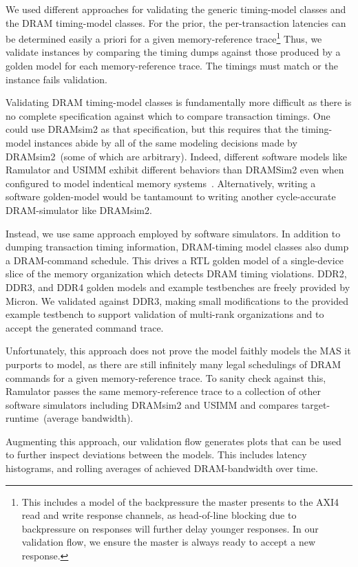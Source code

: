 We used different approaches for validating the generic timing-model classes
and the DRAM timing-model classes. For the prior, the per-transaction latencies
can be determined easily a priori for a given memory-reference trace\footnote{This
includes a model of the backpressure the master presents to the AXI4 read and
write response channels, as head-of-line blocking due to backpressure on
responses will further delay younger responses.  In our validation flow, we
ensure the master is always ready to accept a new response.} Thus, we validate
instances by comparing the timing dumps against those produced by a golden model
for each memory-reference trace. The timings must match or the instance fails
validation.

Validating DRAM timing-model classes is fundamentally more difficult as there
is no complete specification against which to compare transaction timings.
One could use DRAMsim2 as that specification, but this requires that the
timing-model instances abide by all of the same modeling decisions made by
DRAMsim2~(some of which are arbitrary). Indeed, different software models like
Ramulator and USIMM exhibit different behaviors than DRAMSim2 even when
configured to model indentical memory systems~\cite{ramulator}. Alternatively,
writing a software golden-model would be tantamount to writing another
cycle-accurate DRAM-simulator like DRAMsim2.

Instead, we use same approach employed by software simulators. In
addition to dumping transaction timing information, DRAM-timing model classes
also dump a DRAM-command schedule. This drives a RTL golden model of a
single-device slice of the memory organization which detects DRAM timing
violations. DDR2, DDR3, and DDR4 golden models and example testbenches are
freely provided by Micron\cite{microngolden}. We validated against DDR3, making small
modifications to the provided example testbench to support validation of
multi-rank organizations and to accept the generated command trace.

Unfortunately, this approach does not prove the model faithly models the MAS it
purports to model, as there are still infinitely many legal schedulings of DRAM
commands for a given memory-reference trace. To sanity check against this,
Ramulator passes the same memory-reference trace to a collection of other
software simulators including DRAMsim2 and USIMM and compares
target-runtime~(average bandwidth).

Augmenting this approach, our validation flow generates plots that can be used
to further inspect deviations between the models. This includes latency
histograms, and rolling averages of achieved DRAM-bandwidth over time.
